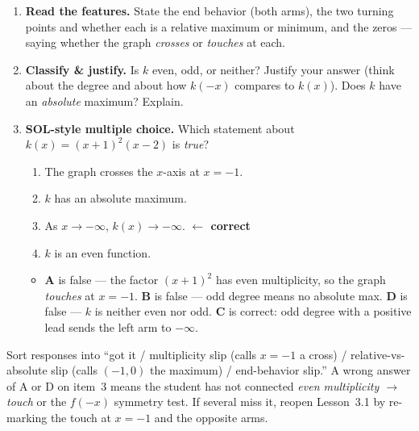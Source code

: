 \documentclass[10pt]{article}
\begin{document}
\begin{enumerate}[leftmargin=1.8em, itemsep=9pt]
  \item \textbf{Read the features.} State the end behavior (both arms), the two turning points and
        whether each is a relative maximum or minimum, and the zeros --- saying whether the graph
        \emph{crosses} or \emph{touches} at each.
  \item \textbf{Classify \& justify.} Is $k$ even, odd, or neither? Justify your answer (think about
        the degree and about how $k(-x)$ compares to $k(x)$). Does $k$ have an \emph{absolute}
        maximum? Explain.
  \item \textbf{SOL-style multiple choice.} Which statement about $k(x)=(x+1)^2(x-2)$ is \emph{true}?
        \begin{enumerate}[label=\Alph*., leftmargin=1.9em, itemsep=1pt]
          \item The graph crosses the $x$-axis at $x=-1$.
          \item $k$ has an absolute maximum.
          \item As $x\to-\infty$, $k(x)\to-\infty$. \textcolor{keyred}{\textbf{$\leftarrow$ correct}}
          \item $k$ is an even function.
        \end{enumerate}
        \begin{itemize}[leftmargin=1.4em, nosep]
          \item[] \textbf{A} is false --- the factor $(x+1)^2$ has even multiplicity, so the graph \emph{touches} at $x=-1$. \textbf{B} is false --- odd degree means no absolute max. \textbf{D} is false --- $k$ is neither even nor odd. \textbf{C} is correct: odd degree with a positive lead sends the left arm to $-\infty$.
        \end{itemize}
\end{enumerate}

\begin{teachernote}
Sort responses into ``got it / multiplicity slip (calls $x=-1$ a cross) / relative-vs-absolute slip
(calls $(-1,0)$ the maximum) / end-behavior slip.'' A wrong answer of A or D on item~3 means the
student has not connected \emph{even multiplicity $\to$ touch} or the $f(-x)$ symmetry test. If
several miss it, reopen Lesson~3.1 by re-marking the touch at $x=-1$ and the opposite arms.
\end{teachernote}
\end{document}
